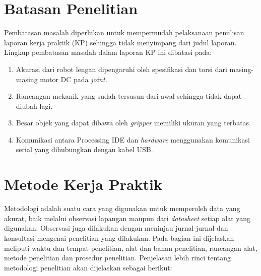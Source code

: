 \section{Batasan Penelitian}
Pembatasan masalah diperlukan untuk mempermudah pelaksanaan penulisan laporan kerja praktik (KP) sehingga tidak menyimpang dari judul laporan. Lingkup pembatasan masalah dalam laporan KP ini dibatasi pada:

\begin{enumerate}
	
	\item Akurasi dari robot lengan dipengaruhi oleh spesifikasi dan torsi dari masing-masing motor DC pada \emph{ joint.}
	\item  Rancangan mekanik yang sudah tersusun dari awal sehingga tidak dapat diubah lagi. 
	\item Besar objek yang dapat dibawa oleh \textit{gripper} memiliki ukuran yang terbatas.
	\item Komunikasi antara Processing IDE dan \textit{hardware} menggunakan komunikasi serial yang dihubungkan dengan kabel USB.
	
\end{enumerate}

\section{Metode Kerja Praktik}
Metodologi adalah suatu cara yang digunakan untuk memperoleh data yang akurat, baik melalui observasi lapangan maupun dari \emph {datasheet} setiap alat yang digunakan. Observasi juga dilakukan dengan meninjau jurnal-jurnal dan konsultasi mengenai penelitian yang dilakukan. Pada bagian ini dijelaskan meliputi waktu dan tempat penelitian, alat dan bahan penelitian, rancangan alat, metode penelitian dan prosedur penelitian. Penjelasan lebih rinci tentang metodologi penelitian akan dijelaskan sebagai berikut: 

